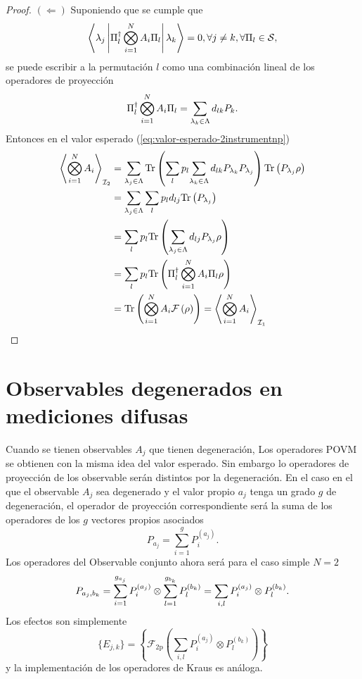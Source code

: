 \documentclass[12pt,oneside]{book}\raggedbottom{}
\begin{document}
\begin{proof}
$(\Leftarrow)$ Suponiendo que se cumple que \[ \left\langle\lambda_j\left|\Pi_{l}^{\dagger}\bigotimes_{i=1}^{N} A_i\Pi_{l}\right|\lambda_k\right\rangle=0, \forall j\neq k, \forall \Pi_l \in \mathcal{S},\] se puede  escribir a la permutación $l$ como una combinación lineal de los operadores de proyección\[\Pi_{l}^{\dagger}\bigotimes_{i=1}^{N} A_i\Pi_{l}=\sum_{\lambda_k \in \Lambda}d_{lk}P_{k}.\]Entonces en el valor esperado ({\ref{eq:valor-esperado-2instrumentnp}})
 \[\begin{split}\left \langle \bigotimes_{i=1}^{N} A_i \right \rangle_{\mathcal{I}_2}&=\sum_{\lambda_j\in \Lambda} {\rm Tr}\left(\sum_{l}p_l{\sum_{\lambda_k \in \Lambda}d_{lk}P_{\lambda_k}}P_{\lambda_j}\right) {\rm Tr}\left(P_{\lambda_j}\rho\right)\\ &=\sum_{\lambda_j\in \Lambda} \sum_{l}p_l d_{lj}{\rm Tr}\left(P_{\lambda_j}\right)\\ &=\sum_{l}p_l {\rm Tr}\left( \sum_{\lambda_j\in \Lambda} d_{lj}P_{\lambda_j}\rho\right)\\ &=\sum_{l}p_l{\rm Tr}\left(\Pi_{l}^{\dagger}\bigotimes_{i=1}^{N} A_i\Pi_{l}\rho\right)\\ 
    &={\rm Tr}\left(\bigotimes_{i=1}^{N} A_i\mathcal{F}\left(\rho\right)\right)=\left \langle \bigotimes_{i=1}^{N} A_i \right \rangle_{\mathcal{I}_1}
\end{split}\]

\end{proof}

\section*{Observables degenerados en mediciones difusas}

Cuando se tienen observables $A_j$ que tienen degeneración, 
 Los operadores POVM se obtienen con la misma idea del valor esperado. Sin embargo lo operadores de proyección de los observable serán distintos por la degeneración. En el caso en el que el observable $A_j$ sea degenerado y el valor propio $a_j$ tenga un grado $g$ de degeneración, el operador de proyección correspondiente será la suma de los operadores de los $g$ vectores propios asociados\[P_{a_j}=\sum_{i=1}^{g} {P}_{i}^{(a_j)}.\] Los operadores del Observable conjunto ahora será para el caso simple $N=2$ \[P_{a_j,b_k}=\sum_{i=1}^{g_{a_j}} {P}_{i}^{(a_j)}\otimes \sum_{l=1}^{g_{b_k}} {P}_{l}^{(b_k)}=\sum_{i,l} {P}_{i}^{(a_j)}\otimes P_{l}^{(b_k)}.\]Los efectos son simplemente \[\{E_{j,k}\}=\left\{\mathcal{F}_{2\text{p}}\left(\sum_{i,l} {P}_{i}^{(a_j)}\otimes P_{l}^{(b_k)}\right)\right\}\] y la implementación de los operadores de Kraus es análoga. 
\end{document}
